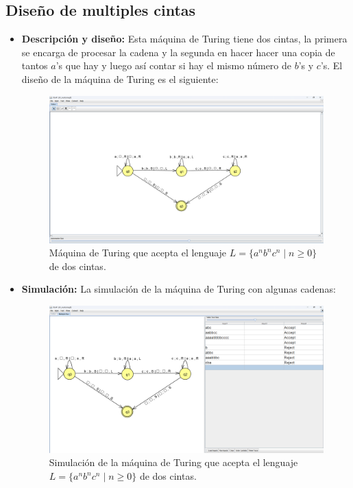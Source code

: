 \documentclass[11pt]{report}
\begin{document}
\newpage

\subsection{Diseño de multiples cintas}
\begin{itemize}
  \item \textbf{Descripción y diseño:} Esta máquina de Turing tiene dos cintas, la primera se encarga de procesar la cadena y la segunda en hacer hacer una copia de tantos $a$'s que hay y luego así contar si hay el mismo número de $b$'s y $c$'s. El diseño de la máquina de Turing es el siguiente:

        \begin{figure}[H]
          \centering
          \includegraphics[scale=0.33]{img/MT_01_multiple_ribbon.png}
          \caption{Máquina de Turing que acepta el lenguaje $L = \{a^nb^nc^n \mid n \geq 0\}$ de dos cintas.}
          \label{fig:maquina de turing que acepta el lenguaje L = {a^nb^nc^n | n >= 0}}
        \end{figure}

        \newpage

  \item \textbf{Simulación:} La simulación de la máquina de Turing con algunas cadenas:
        \begin{figure}[H]
          \centering
          \includegraphics[scale=0.33]{img/MT_01_multiple_ribbon_simulation.png}
          \caption{Simulación de la máquina de Turing que acepta el lenguaje $L = \{a^nb^nc^n \mid n \geq 0\}$ de dos cintas.}
          \label{fig:simulacion de la maquina de turing que acepta el lenguaje L = {a^nb^nc^n | n >= 0}}
        \end{figure}
\end{itemize}
\end{document}
